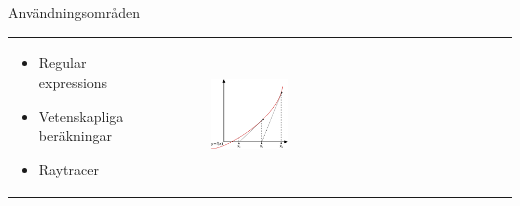 \documentclass{beamer}
\newcommand{\sepFrame}[1] {
\begin{frame}
\begin{center}
	\Huge{#1}
\end{center}
\end{frame}
}
\begin{document}
\sepFrame{Användningsområden}

\begin{frame}

\begin{tabular}{ m{5.5cm} m{4cm} }

\begin{itemize}
	\item Regular expressions
	\item Vetenskapliga beräkningar %
	\item Raytracer
\end{itemize}
&
\begin{figure}[H]
\centering
    \includegraphics[width=0.3\textwidth]{img/metod.png} 
\end{figure}

\end{tabular}


\end{frame}
\end{document}
